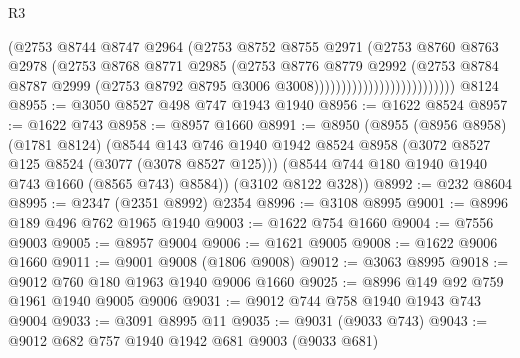 \begin{lexlean}{R3}
\begin{coremodule}
                                          (@2753
                                            @8744
                                            @8747
                                            @2964
                                            (@2753
                                              @8752
                                              @8755
                                              @2971
                                              (@2753
                                                @8760
                                                @8763
                                                @2978
                                                (@2753
                                                  @8768
                                                  @8771
                                                  @2985
                                                  (@2753
                                                    @8776
                                                    @8779
                                                    @2992
                                                    (@2753
                                                      @8784
                                                      @8787
                                                      @2999
                                                      (@2753
                                                        @8792
                                                        @8795
                                                        @3006
                                                        @3008))))))))))))))))))))))))))
    @8124
@8955 := @3050 @8527 @498 @747 @1943 @1940
@8956 := @1622 @8524
@8957 := @1622 @743
@8958 := @8957 @1660
@8991 := @8950
    (@8955
      (@8956 @8958)
      (@1781 @8124)
      (@8544
        @143
        @746
        @1940
        @1942
        @8524
        @8958
        (@3072 @8527 @125 @8524 (@3077 (@3078 @8527 @125)))
        (@8544 @744 @180 @1940 @1940 @743 @1660 (@8565 @743) @8584))
      (@3102 @8122 @328))
@8992 := @232 @8604
@8995 := @2347 (@2351 @8992) @2354
@8996 := @3108 @8995
@9001 := @8996 @189 @496 @762 @1965 @1940
@9003 := @1622 @754 @1660
@9004 := @7556 @9003
@9005 := @8957 @9004
@9006 := @1621 @9005
@9008 := @1622 @9006 @1660
@9011 := @9001 @9008 (@1806 @9008)
@9012 := @3063 @8995
@9018 := @9012 @760 @180 @1963 @1940 @9006 @1660
@9025 := @8996 @149 @92 @759 @1961 @1940 @9005 @9006
@9031 := @9012 @744 @758 @1940 @1943 @743 @9004
@9033 := @3091 @8995 @11
@9035 := @9031 (@9033 @743)
@9043 := @9012 @682 @757 @1940 @1942 @681 @9003 (@9033 @681)

\end{coremodule}
\end{lexlean}
